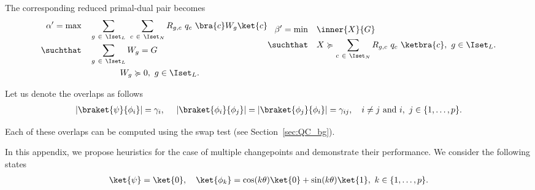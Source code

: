 \begin{appendices}
The corresponding reduced primal-dual pair becomes
\begin{equation}
\label{prog:ch3_QSD-D'_mQCP}
        \begin{aligned}
            \alpha' = \max \quad & \sum_{g\ \in\ \Iset_L}\ \sum_{c\ \in\ \Iset_N} R_{g, c}\ q_c\ \bra{c} W_g \ket{c} \\
            \suchthat \quad & \sum_{g\ \in\ \Iset_L} W_g = G \\
            & \hspace{35pt} W_g \succcurlyeq 0,\ g \in \Iset_L.
        \end{aligned}
        \begin{aligned}
            \beta' = \min \quad & \inner{X}{G} \\
            \suchthat \quad & X \succcurlyeq \sum_{c\ \in\ \Iset_N} R_{g, c}\ q_c\ \ketbra{c},\ g \in \Iset_L.\\
            & \phantom{N}
        \end{aligned}
\end{equation}

Let us denote the overlaps as follows
\begin{equation}
    \label{eq:ch3_QSD-inner_prod}
    \begin{aligned}
        |\braket{\psi}{\phi_i}| = \gamma_{i},\ \quad |\braket{\phi_i}{\phi_j}| = |\braket{\phi_j}{\phi_i}| = \gamma_{ij},
        \quad i \ne j \text{ and } i,\ j \in \{1, \dots, p\}.
    \end{aligned}
\end{equation}

Each of these overlaps can be computed using the swap test (see Section~\ref{sec:QC_bg}).

In this appendix, we propose heuristics for the case of multiple changepoints and demonstrate their performance.
We consider the following states
\begin{align}
    \label{eq:ch3_QSD-theta_states}
    \ket{\psi} = \ket{0}, \quad \ket{\phi_k} = \cos(k \theta) \ket{0} + \sin(k \theta) \ket{1},\ k \in \{1, \dots, p\}.
\end{align} 


\end{appendices}
